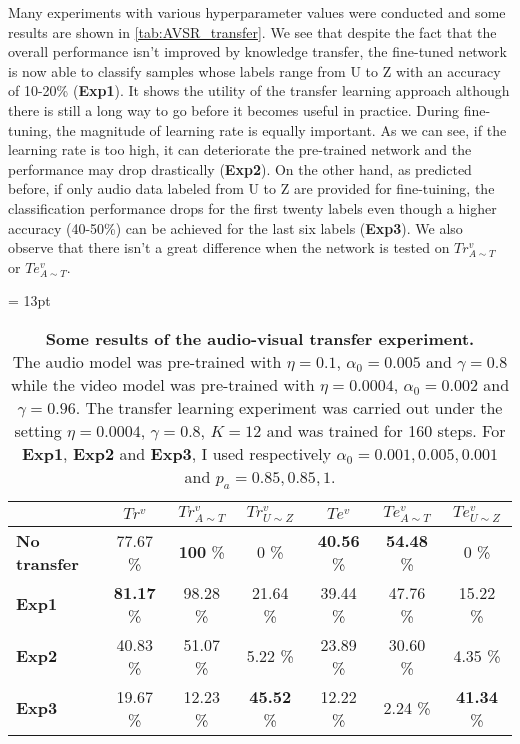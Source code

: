 Many experiments with various hyperparameter values were conducted
and some results are shown in \autoref{tab:AVSR_transfer}.
We see that despite the fact that the overall performance isn't improved
by knowledge transfer, the fine-tuned network is now able to classify
samples whose labels range from U to Z with an accuracy of 10-20\%
(\textbf{Exp1}). It shows the utility of the transfer learning approach
although there is still a long way to go before it becomes
useful in practice.
During fine-tuning, the magnitude of learning rate is equally important.
As we can see, if the learning rate is too high, it can deteriorate
the pre-trained network and the performance may drop drastically
(\textbf{Exp2}).
On the other hand, as predicted before, if only audio data labeled from
U to Z are provided for fine-tuining, the classification performance
drops for the first twenty labels even though a higher accuracy (40-50\%)
can be achieved for the last six labels (\textbf{Exp3}).
We also observe that there isn't a great difference when the network is
tested on $Tr_{A\sim T}^v$ or $Te_{A\sim T}^v$.

\begin{table}[H]
  \tabcolsep = 13pt
  \caption{\textbf{Some results of the audio-visual transfer experiment.}
    \\[0.1em]
  The audio model was pre-trained with $\eta=0.1$, $\alpha_0=0.005$ and
  $\gamma=0.8$ while the video model was pre-trained with $\eta=0.0004$,
  $\alpha_0=0.002$ and $\gamma=0.96$. The transfer learning experiment
  was carried out under the setting $\eta=0.0004$, $\gamma=0.8$, $K=12$
  and was trained for 160 steps.
  For \textbf{Exp1}, \textbf{Exp2} and \textbf{Exp3}, I used respectively
  $\alpha_0 = 0.001, 0.005, 0.001$ and $p_a = 0.85, 0.85, 1$.
  }
  \label{tab:AVSR_transfer}
  \begin{tabular*}{\linewidth}{>{\bf}lcccccc}
    \toprule
    & $Tr^v$ & $Tr^v_{A\sim T}$ & $Tr^v_{U\sim Z}$
    & $Te^v$ & $Te^v_{A\sim T}$ & $Te^v_{U\sim Z}$\\
    \midrule
    No transfer & 77.67 \% & \textbf{100} \% & 0 \% & \textbf{40.56} \%
    & \textbf{54.48} \% & 0 \% \\
    Exp1 & \textbf{81.17} \% & 98.28 \% & 21.64 \% & 39.44 \%
    & 47.76 \% & 15.22 \% \\
    Exp2 &  40.83 \% & 51.07 \% & 5.22 \% & 23.89 \%
    & 30.60 \% & 4.35 \% \\
    Exp3 & 19.67 \% & 12.23 \% & \textbf{45.52} \% & 12.22 \%
    & 2.24 \% & \textbf{41.34} \% \\
    \bottomrule
  \end{tabular*}
\end{table}

